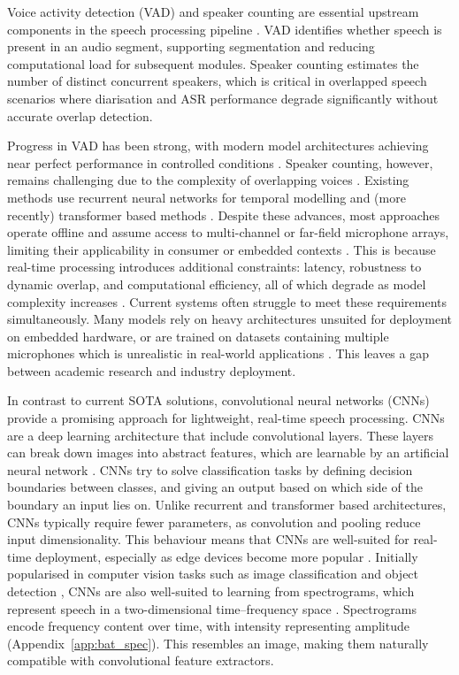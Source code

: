 \noindent Voice activity detection (VAD) and speaker counting are essential upstream components in the speech processing pipeline \cite{importance_of_vad}. VAD identifies whether speech is present in an audio segment, supporting segmentation and reducing computational load for subsequent modules. Speaker counting estimates the number of distinct concurrent speakers, which is critical in overlapped speech scenarios \cite{importance_of_OSD} where diarisation and ASR performance degrade significantly without accurate overlap detection.\newline

\noindent Progress in VAD has been strong, with modern model architectures achieving near perfect performance in controlled conditions \cite{vad_review}. Speaker counting, however, remains challenging due to the complexity of overlapping voices \cite{speaker_counting}. Existing methods use recurrent neural networks for temporal modelling \cite{lstm} and (more recently) transformer based methods \cite{transformers}. Despite these advances, most approaches operate offline and assume access to multi-channel or far-field microphone arrays, limiting their applicability in consumer or embedded contexts \cite{speaker_count_offline}. This is because real-time processing introduces additional constraints: latency, robustness to dynamic overlap, and computational efficiency, all of which degrade as model complexity increases \cite{efficient_ml}. Current systems often struggle to meet these requirements simultaneously. Many models rely on heavy architectures unsuited for deployment on embedded hardware, or are trained on datasets containing multiple microphones which is unrealistic in real-world applications \cite{libricss}. This leaves a gap between academic research and industry deployment.\newline

\noindent In contrast to current SOTA solutions, convolutional neural networks (CNNs) \cite{cnn} provide a promising approach for lightweight, real-time speech processing. CNNs are a deep learning architecture that include convolutional layers. These layers can break down images into abstract features, which are learnable by an artificial neural network \cite{IBM_CNN}. CNNs try to solve classification tasks by defining decision boundaries between classes, and giving an output based on which side of the boundary an input lies on. Unlike recurrent and transformer based architectures, CNNs typically require fewer parameters, as convolution and pooling reduce input dimensionality. This behaviour means that CNNs are well-suited for real-time deployment, especially as edge devices become more popular \cite{edgecomputing}. Initially popularised in computer vision tasks such as image classification and object detection \cite{cnn_other_uses}, CNNs are also well-suited to learning from spectrograms, which represent speech in a two-dimensional time--frequency space \cite{specs_and_cnns}. Spectrograms encode frequency content over time, with intensity representing amplitude (Appendix~\ref{app:bat_spec}). This resembles an image, making them naturally compatible with convolutional feature extractors.\newline



